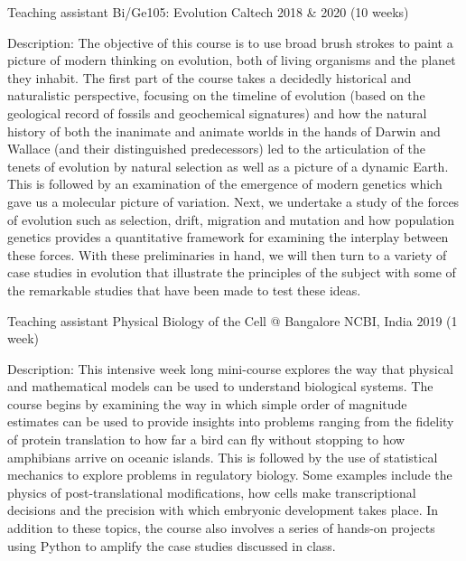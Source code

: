 \begin{cventries}
  \cventry
    {Teaching assistant} %
    {Bi/Ge105: Evolution} %
    {Caltech} %
    {2018 \& 2020 (10 weeks)} %
    {
      \begin{cvitems} %
        \item {Description: The objective of this course is to use broad brush
        strokes to paint a picture of modern thinking on evolution, both of
        living organisms and the planet they inhabit. The first part of the
        course takes a decidedly historical and naturalistic perspective,
        focusing on the timeline of evolution (based on the geological record
        of fossils and geochemical signatures) and how the natural history of
        both the inanimate and animate worlds in the hands of Darwin and
        Wallace (and their distinguished predecessors) led to the articulation
        of the tenets of evolution by natural selection as well as a picture of
        a dynamic Earth. This is followed by an examination of the emergence of
        modern genetics which gave us a molecular picture of variation. Next,
        we undertake a study of the forces of evolution such as selection,
        drift, migration and mutation and how population genetics provides a
        quantitative framework for examining the interplay between these
        forces. With these preliminaries in hand, we will then turn to a
        variety of case studies in evolution that illustrate the principles of
        the subject with some of the remarkable studies that have been made to
        test these ideas.}
      \end{cvitems}
    }
  \cventry
    {Teaching assistant} %
    {Physical Biology of the Cell @ Bangalore} %
    {NCBI, India} %
    {2019 (1 week)} %
    {
      \begin{cvitems} %
        \item {Description: This intensive week long mini-course explores the
        way that physical and mathematical models can be used to understand
        biological systems. The course begins by examining the way in which
        simple order of magnitude estimates can be used to provide insights
        into problems ranging from the fidelity of protein translation to how
        far a bird can fly without stopping to how amphibians arrive on oceanic
        islands. This is followed by the use of statistical mechanics to
        explore problems in regulatory biology. Some examples include the
        physics of post-translational modifications, how cells make
        transcriptional decisions and the precision with which embryonic
        development takes place. In addition to these topics, the course also
        involves a series of hands-on projects using Python to amplify the case
        studies discussed in class.\\}
      \end{cvitems}
    }


\end{cventries}
